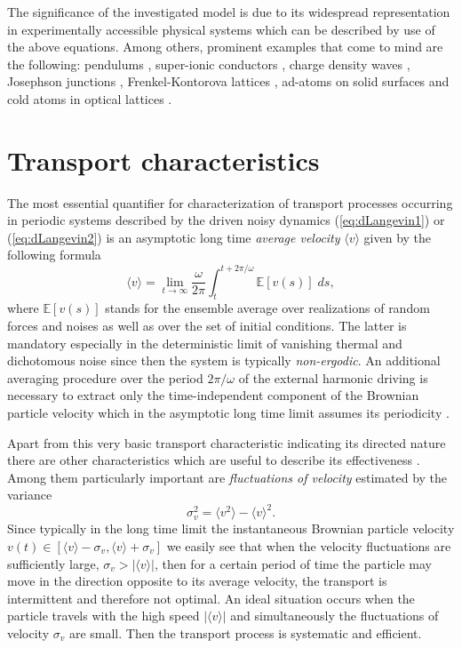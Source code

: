 \documentclass[12pt]{iopart}
\begin{document}
The significance of the investigated model is due to its widespread representation in experimentally accessible physical systems which can be described by use of the above equations. Among others, prominent examples that come to mind are the following: pendulums \cite{gitterman2010}, super-ionic conductors \cite{fulde1977}, charge density waves \cite{gruner1981}, Josephson junctions \cite{kautz1996}, Frenkel-Kontorova lattices \cite{braun1998}, ad-atoms on solid surfaces \cite{guantes2001} and cold atoms in optical lattices \cite{renzon1,renzon2,denisov2014}. 
\section{Transport characteristics}
\label{sec4}
The most essential quantifier for characterization of transport processes occurring in periodic systems described by the driven noisy dynamics (\ref{eq:dLangevin1}) or (\ref{eq:dLangevin2}) is an asymptotic long time \emph{average velocity} $\langle v \rangle$ given by the following formula
\begin{equation}
	\langle v \rangle = \lim_{t\to\infty} \frac{\omega}{2\pi} \int_{t}^{t+2\pi/\omega} 
{\mathbb E}[v(s)] \; ds, 
\end{equation}
where ${\mathbb E}[v(s)]$ stands for the ensemble average over realizations of random forces and noises as well as over the set of initial conditions. The latter is mandatory especially in the deterministic limit of vanishing thermal and dichotomous noise since then the system is typically \emph{non-ergodic}. An additional averaging procedure over the period $2\pi/\omega$ of the external harmonic driving is necessary to extract only the time-independent component of the Brownian particle velocity which in the asymptotic long time limit assumes its periodicity \cite{acta_jj,jung1993,spiechNJP}.

Apart from this very basic transport characteristic indicating its directed nature there are other characteristics which are useful to describe its effectiveness \cite{jung1996,linke2005,MacKos2004}. Among them particularly 
important are \emph{fluctuations of velocity} estimated by the variance 
\begin{equation}
	\sigma_v^2 = \langle v^2 \rangle - \langle v \rangle^2.
\end{equation}
Since typically in the long time limit the instantaneous Brownian particle velocity $v(t) \in [\langle v \rangle - \sigma_v, \langle v \rangle + \sigma_v]$ we easily see that when the velocity fluctuations are sufficiently large, 
$\sigma_v > |\langle v \rangle|$, then for a certain period of time the particle may move in the direction opposite to its average velocity, the transport is intermittent and therefore not optimal. An ideal situation occurs when the particle travels with the high speed $|\langle v \rangle|$ and simultaneously the fluctuations of velocity $\sigma_v$ are small. Then the transport process is systematic and efficient.
\end{document}
